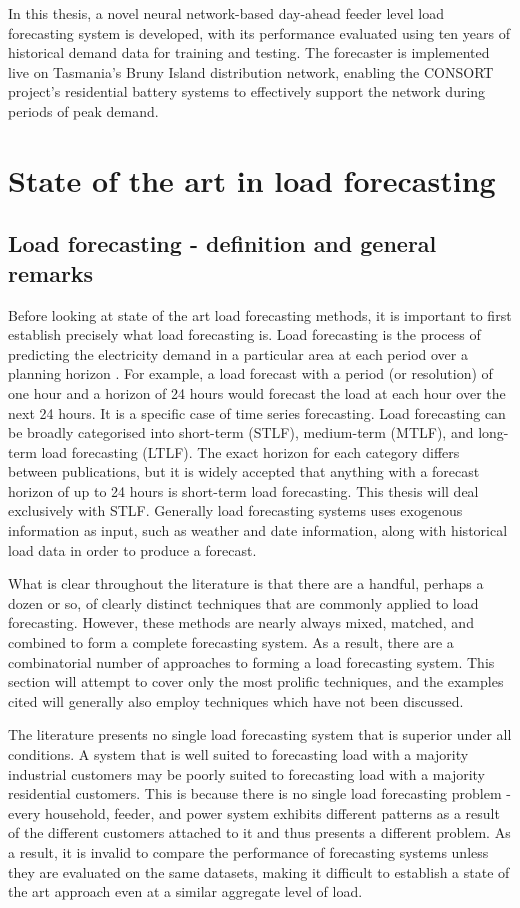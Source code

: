 In this thesis, a novel neural network-based day-ahead feeder level load forecasting system is developed, with its performance evaluated using ten years of historical demand data for training and testing. The forecaster is implemented live on Tasmania's Bruny Island distribution network, enabling the CONSORT project's residential battery systems to effectively support the network during periods of peak demand.

\section{State of the art in load forecasting}

\subsection{Load forecasting - definition and general remarks}
Before looking at state of the art load forecasting methods, it is important to first establish precisely what load forecasting is.
Load forecasting is the process of predicting the electricity demand in a particular area at each period over a planning horizon \citep{Weron2006}.
For example, a load forecast with a period (or resolution) of one hour and a horizon of 24 hours would forecast the load at each hour over the next 24 hours.
It is a specific case of time series forecasting.
Load forecasting can be broadly categorised into short-term (STLF), medium-term (MTLF), and long-term load forecasting (LTLF).
The exact horizon for each category differs between publications, but it is widely accepted that anything with a forecast horizon of up to 24 hours is short-term load forecasting.
This thesis will deal exclusively with STLF.
Generally load forecasting systems uses exogenous information as input, such as weather and date information, along with historical load data in order to produce a forecast.

What is clear throughout the literature is that there are a handful, perhaps a dozen or so, of clearly distinct techniques that are commonly applied to load forecasting.
However, these methods are nearly always mixed, matched, and combined to form a complete forecasting system.
As a result, there are a combinatorial number of approaches to forming a load forecasting system.
This section will attempt to cover only the most prolific techniques, and the examples cited will generally also employ techniques which have not been discussed.

The literature presents no single load forecasting system that is superior under all conditions.
A system that is well suited to forecasting load with a majority industrial customers may be poorly suited to forecasting load with a majority residential customers.
This is because there is no single load forecasting problem - every household, feeder, and power system exhibits different patterns as a result of the different customers attached to it and thus presents a different problem.
As a result, it is invalid to compare the performance of forecasting systems unless they are evaluated on the same datasets, making it difficult to establish a state of the art approach even at a similar aggregate level of load.

